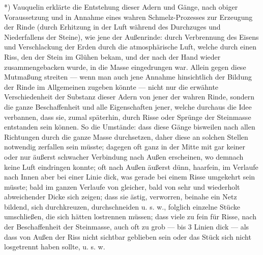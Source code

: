 \documentclass[a4paper, 11pt, oneside, german]{article}
\begin{document}
*) Vauquelin erklärte die Entstehung dieser Adern und Gänge, nach obiger Voraussetzung und in Annahme eines wahren Schmelz-Prozesses zur Erzeugung der Rinde (durch Erhitzung in der Luft während des Durchzuges und Niederfallens der Steine), wie jene der Außenrinde: durch Verbrennung des Eisens und Verschlackung der Erden durch die atmosphärische Luft, welche durch einen Riss, den der Stein im Glühen bekam, und der nach der Hand wieder zusammengebacken wurde, in die Masse eingedrungen war. Allein gegen diese Mutmaßung streiten --- wenn man auch jene Annahme hinsichtlich der Bildung der Rinde im Allgemeinen zugeben könnte --- nicht nur die erwähnte Verschiedenheit der Substanz dieser Adern von jener der wahren Rinde, sondern die ganze Beschaffenheit und alle Eigenschaften jener, welche durchaus die Idee verbannen, dass sie, zumal späterhin, durch Risse oder Sprünge der Steinmasse entstanden sein können. So die Umstände: dass diese Gänge bisweilen nach allen Richtungen durch die ganze Masse durchsetzen, daher diese an solchen Stellen notwendig zerfallen sein müsste; dagegen oft ganz in der Mitte mit gar keiner oder nur äußerst schwacher Verbindung nach Außen erscheinen, wo demnach keine Luft eindringen konnte; oft nach Außen äußerst dünn, haarfein, im Verlaufe nach Innen aber bei einer Linie dick, was gerade bei einem Risse umgekehrt sein müsste; bald im ganzen Verlaufe von gleicher, bald von sehr und wiederholt abweichender Dicke sich zeigen; dass sie ästig, verworren, beinahe ein Netz bildend, sich durchkreuzen, durchschneiden u. s. w., folglich einzelne Stücke umschließen, die sich hätten lostrennen müssen; dass viele zu fein für Risse, nach der Beschaffenheit der Steinmasse, auch oft zu grob --- bis 3 Linien dick --- als dass von Außen der Riss nicht sichtbar geblieben sein oder das Stück sich nicht losgetrennt haben sollte, u. s. w.  
\end{document}
